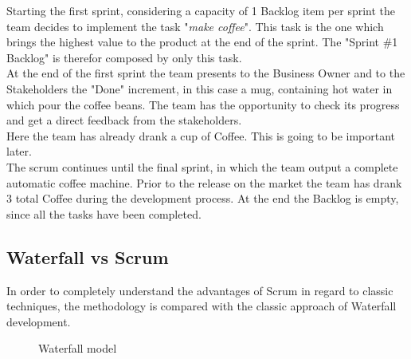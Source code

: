 \documentclass[../main.tex]{subfiles}
\newcommand\connectow[2]%
  {\draw[thick, ->] (#1) |- (#2);
  }
\begin{document}
Starting the first sprint, considering a capacity of 1 Backlog item per sprint the team decides to implement the task "\textit{make coffee}". This task is the one which brings the highest value to the product at the end of the sprint. The "Sprint \#1 Backlog" is therefor composed by only this task.\\
At the end of the first sprint the team presents to the Business Owner and to the Stakeholders the "Done" increment, in this case a mug, containing hot water in which pour the coffee beans. The team has the opportunity to check its progress and get a direct feedback from the stakeholders.\\ Here the team has already drank a cup of Coffee. This is going to be important later.\\ The scrum continues until the final sprint, in which the team output a complete automatic coffee machine. Prior to the release on the market the team has drank 3 total Coffee during the development process. At the end the Backlog is empty, since all the tasks have been completed. 
\subsection{Waterfall vs Scrum}
In order to completely understand the advantages of Scrum in regard to classic techniques, the methodology is compared with the classic approach of Waterfall development. 
\begin{figure}[H]
\centering
\caption{Waterfall model}
\end{figure}
\end{document}
